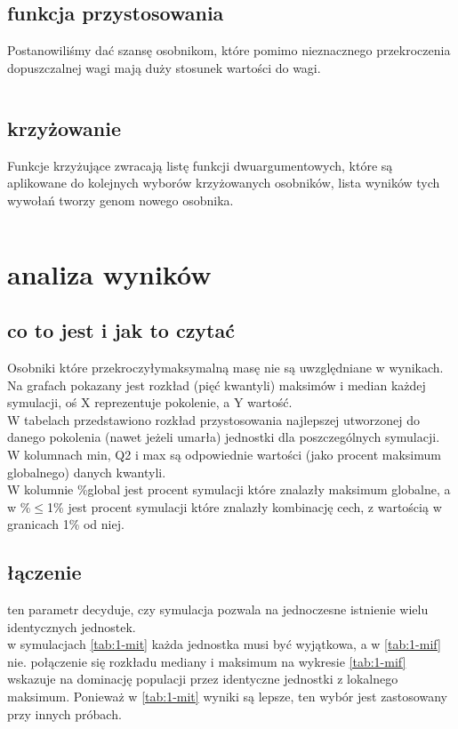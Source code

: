 \documentclass{article}
\begin{document}
\subsection{funkcja przystosowania}
Postanowiliśmy dać szansę osobnikom, które pomimo nieznacznego przekroczenia dopuszczalnej
wagi mają duży stosunek wartości do wagi.
\inputminted{clojure}{snippets/alg.clj_scoring}
\subsection{krzyżowanie}
Funkcje krzyżujące zwracają listę funkcji dwuargumentowych, które są aplikowane
do kolejnych wyborów krzyżowanych osobników, lista wyników tych wywołań tworzy
genom nowego osobnika.
\inputminted{clojure}{snippets/alg.clj_krzyżowanie}

\newpage



\section{analiza wyników}
\subsection{co to jest i jak to czytać}
Osobniki które przekroczyłymaksymalną masę nie są uwzględniane w wynikach.
\\
Na grafach pokazany jest rozkład (pięć kwantyli) maksimów i median każdej
symulacji, oś X reprezentuje pokolenie, a Y wartość.
\\
W tabelach przedstawiono rozkład przystosowania najlepszej utworzonej do danego pokolenia
(nawet jeżeli umarła) jednostki dla poszczególnych symulacji.
\\
W kolumnach min, Q2 i max są odpowiednie wartości (jako procent maksimum globalnego) danych kwantyli.
\\
W kolumnie \%global jest procent symulacji które znalazły maksimum globalne, a
w \%$\le$1\% jest procent symulacji które znalazły kombinację cech, z wartością w
granicach 1\% od niej.

\subsection{łączenie}
ten parametr decyduje, czy symulacja pozwala na jednoczesne istnienie wielu
identycznych jednostek.\\
w symulacjach \ref{tab:1-mit} każda jednostka musi być wyjątkowa, a w
\ref{tab:1-mif} nie. połączenie się rozkładu mediany i maksimum na wykresie
\ref{tab:1-mif} wskazuje na dominację populacji przez identyczne jednostki
z lokalnego maksimum. Ponieważ w \ref{tab:1-mit} wyniki są lepsze, ten wybór
jest zastosowany przy innych próbach.
\end{document}

